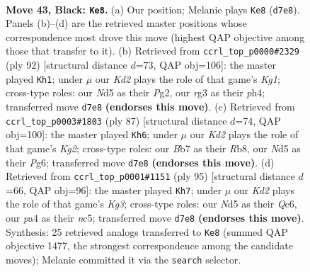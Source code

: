 \documentclass[11pt]{article}
\begin{document}
\clearpage

\begin{figure}[p]\centering
\begin{subfigure}{0.46\textwidth}\centering
\resizebox{\linewidth}{!}{%
\newchessgame
\chessboard[
  setfen={8/1b1k1p2/qp1Q4/1N1n1K2/P2Pp3/6R1/8/7R b - - 6 43},
  showmover=false,
  pgfstyle=straightmove, color=movearrow, markmove={d7-e8}
]}
\caption{}
\end{subfigure}\hfill
\begin{subfigure}{0.46\textwidth}\centering
\resizebox{\linewidth}{!}{%
\newchessgame
\chessboard[
  setfen={6k1/8/pBP5/3p1p2/P2Qn2p/4P2P/5qP1/6K1 w - - 3 47},
  showmover=false,
  pgfstyle=straightmove, color=movearrow, markmove={g1-h1}
]}
\caption{}
\end{subfigure}
\\[4pt]
\begin{subfigure}{0.46\textwidth}\centering
\resizebox{\linewidth}{!}{%
\newchessgame
\chessboard[
  setfen={1r6/q3pQk1/3p2p1/2P5/3nP3/6P1/7P/5R1K b - - 1 44},
  showmover=false,
  pgfstyle=straightmove, color=movearrow, markmove={g7-h6}
]}
\caption{}
\end{subfigure}\hfill
\begin{subfigure}{0.46\textwidth}\centering
\resizebox{\linewidth}{!}{%
\newchessgame
\chessboard[
  setfen={8/8/2q1pQk1/2NpP3/1rn5/2p5/2K2PP1/8 b - - 6 48},
  showmover=false,
  pgfstyle=straightmove, color=movearrow, markmove={g6-h7}
]}
\caption{}
\end{subfigure}
\caption{\textbf{Move 43, Black: \texttt{Ke8}.} (a) Our position; Melanie plays \texttt{Ke8} (\texttt{d7e8}). Panels (b)--(d) are the retrieved master positions whose correspondence most drove this move (highest QAP objective among those that transfer to it). (b) Retrieved from \texttt{ccrl\_top\_p0000\#2329} (ply 92) [structural distance $d$=73, QAP obj=106]: the master played \texttt{Kh1}; under $\mu$ our \emph{Kd2} plays the role of that game's \emph{Kg1}; cross-type roles: our \emph{N}d5 as their \emph{P}g2, our \emph{r}g3 as their \emph{p}h4; transferred move \texttt{d7e8} \textbf{(endorses this move)}. (c) Retrieved from \texttt{ccrl\_top\_p0003\#1803} (ply 87) [structural distance $d$=74, QAP obj=100]: the master played \texttt{Kh6}; under $\mu$ our \emph{Kd2} plays the role of that game's \emph{Kg2}; cross-type roles: our \emph{B}b7 as their \emph{R}b8, our \emph{N}d5 as their \emph{P}g6; transferred move \texttt{d7e8} \textbf{(endorses this move)}. (d) Retrieved from \texttt{ccrl\_top\_p0001\#1151} (ply 95) [structural distance $d$=66, QAP obj=96]: the master played \texttt{Kh7}; under $\mu$ our \emph{Kd2} plays the role of that game's \emph{Kg3}; cross-type roles: our \emph{N}d5 as their \emph{Q}c6, our \emph{p}a4 as their \emph{n}c5; transferred move \texttt{d7e8} \textbf{(endorses this move)}. Synthesis: 25 retrieved analogs transferred to \texttt{Ke8} (summed QAP objective 1477, the strongest correspondence among the candidate moves); Melanie committed it via the \texttt{search} selector.}
\label{fig:thought-m85}
\end{figure}
\end{document}
